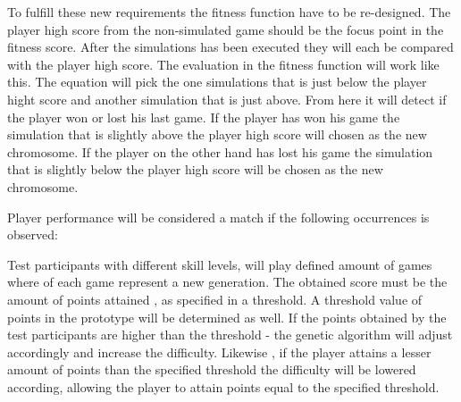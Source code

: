 To fulfill these new requirements the fitness function have to be re-designed. The player high score from the non-simulated game should be the focus point in the fitness score. After the simulations has been executed they will each be compared with the player high score. The evaluation in the fitness function will work like this. The equation will pick the one simulations that is just below the player hight score and another simulation that is just above. From here it will detect if the player won or lost his last game. If the player has won his game the simulation that is slightly above the player high score will chosen as the new chromosome. If the player on the other hand has lost his game the simulation that is slightly below the player high score will be chosen as the new chromosome.

Player performance will be considered a match if the following occurrences is observed:

Test participants with different skill levels, will play defined amount of games where of each game represent a new generation. The obtained score must be the amount of points attained , as specified in a threshold. A threshold value of points in the prototype will be determined as well.
If the points obtained by the test participants are higher than the threshold - the genetic algorithm will adjust accordingly and increase the difficulty. Likewise , if the player attains a lesser amount of points than the specified threshold the difficulty will be lowered according, allowing the player to attain points equal to the specified threshold.
